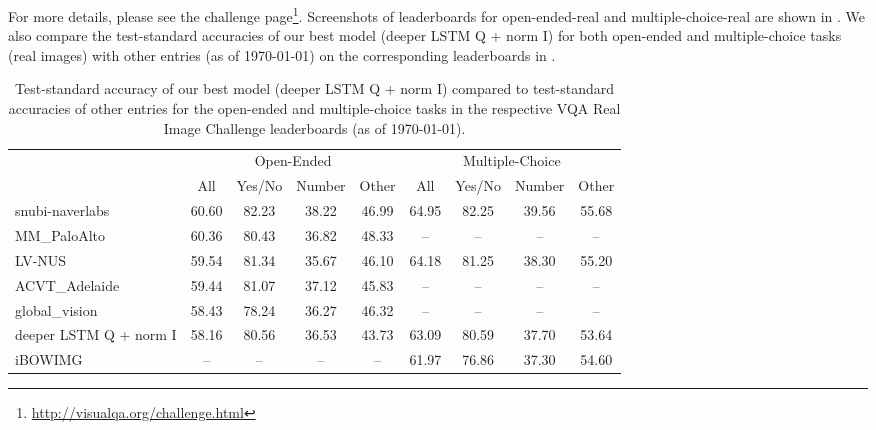 For more details, please see the challenge page\footnote{\url{http://visualqa.org/challenge.html}}. Screenshots of leaderboards for open-ended-real and multiple-choice-real are shown in .
We also compare the test-standard accuracies of our best model (deeper LSTM Q + norm I) for both open-ended and multiple-choice tasks (real images) with other entries (as of \today) on the corresponding leaderboards in .

\begin{table}[t] \scriptsize
\setlength{\tabcolsep}{1.8pt}
\begin{center}
\begin{tabular}{@{} l  c  c  c  c  c  c c c@{}}
\toprule
& \multicolumn{4}{c}{Open-Ended} & \multicolumn{4}{c}{ Multiple-Choice} \\

\cmidrule[0.75pt](l){2-5}
\cmidrule[0.75pt](l){6-9}
 & All & Yes/No & Number & Other & All & Yes/No & Number & Other \\
\midrule
snubi-naverlabs & 60.60 & 82.23 & 38.22 & 46.99 
& 64.95 & 82.25 & 39.56 & 55.68 \\
MM\_PaloAlto & 60.36 & 80.43 & 36.82 & 48.33 
& -- & -- & -- & -- \\
LV-NUS & 59.54 & 81.34 & 35.67 & 46.10 
& 64.18 & 81.25 & 38.30 & 55.20 \\
ACVT\_Adelaide & 59.44 & 81.07 & 37.12 & 45.83 
& -- & -- & -- & --\\
global\_vision & 58.43 & 78.24 & 36.27 & 46.32 
& -- & -- & -- & --\\
deeper LSTM Q + norm I & 58.16 & 80.56 & 36.53 & 43.73 
& 63.09 & 80.59 & 37.70 & 53.64\\
iBOWIMG	 & -- & -- & -- & --
& 61.97 & 76.86 & 37.30 & 54.60\\
\bottomrule
\end{tabular}	
\caption{Test-standard accuracy of our best model (deeper LSTM Q + norm I) compared to test-standard accuracies of other entries for the open-ended and multiple-choice tasks in the respective VQA Real Image Challenge leaderboards (as of \today).}
\label{tab:comparison_leaderboard}
\end{center}
\end{table}

